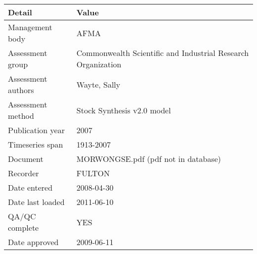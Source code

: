 \begin{table}[htb]
\centering
\begin{tabular}{lp{7cm}}
\toprule
Detail & Value \\
\midrule
Management body    & AFMA                                                         \\
Assessment group   & Commonwealth Scientific and Industrial Research Organization \\
Assessment authors & Wayte, Sally                                                 \\
Assessment method  & Stock Synthesis v2.0 model                                   \\
Publication year   & 2007                                                         \\
Timeseries span    & 1913-2007                                                    \\
Document           & MORWONGSE.pdf (pdf not in database)                          \\
Recorder           & FULTON                                                       \\
Date entered       & 2008-04-30                                                   \\
Date last loaded   & 2011-06-10                                                   \\
QA/QC complete     & YES                                                          \\
Date approved      & 2009-06-11                                                   \\
\bottomrule
\end{tabular}
\label{tab:assessdet}
\end{table}
